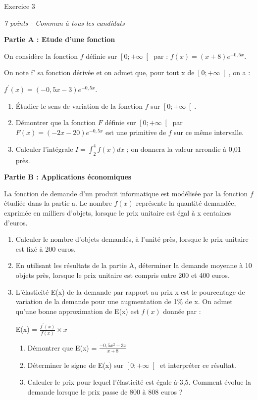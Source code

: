
%
\begin{h2}Exercice 3\end{h2}
\textit{7 points - Commun à tous les candidats}
\par
\textbf{Partie A : Etude d'une fonction}
\par
On considère la fonction $f$ définie sur $\left[0 ;+\infty \right[$ par : $f\left(x\right)=\left(x+8\right) e^{-0,5x}$.
\par
On note f' sa fonction dérivée et on admet que, pour tout x de $\left[0 ;+\infty \right[$, on a :
\par
$f^{\prime}\left(x\right)=\left(-0,5x-3\right)e^{-0,5x}$.
\begin{enumerate}
     \item
     Étudier le sens de variation de la fonction $f$ sur $\left[0 ; +\infty \right[$.
     \item
     Démontrer que la fonction $F$ définie sur $\left[0 ;+\infty \right[$ par $F\left(x\right)=\left(-2x -20\right) e^{-0,5x}$ est une primitive de $f$ sur ce même intervalle.
     \item
     Calculer l'intégrale $I=\int_{2}^{4}f\left(x\right)dx$ ; on donnera la valeur arrondie à 0,01 près.
\end{enumerate}
\par
\textbf{Partie B : Applications économiques}
\par
La fonction de demande d'un produit informatique est modélisée par la fonction $f$ étudiée dans la partie a. Le nombre $f\left(x\right)$ représente la quantité demandée, exprimée en milliers d'objets, lorsque le prix unitaire est égal à x centaines d'euros.
\begin{enumerate}
     \item
     Calculer le nombre d'objets demandés, à l'unité près, lorsque le prix unitaire est fixé à 200 euros.
     \item
     En utilisant les résultats de la partie A, déterminer la demande moyenne à 10 objets près, lorsque le prix unitaire est compris entre 200 et 400 euros.
     \item
     L'élasticité E(x)  de la demande par rapport au prix x est le pourcentage de variation de la demande pour une augmentation de 1\% de x. On admet qu'une bonne approximation de E(x) est $f\left(x\right)$ donnée par :
     \par
     E(x) = $\frac{f^{\prime}\left(x\right)}{f\left(x\right)}\times x$
     \begin{enumerate}[label=\alph*.]
          \item
          Démontrer que E(x) = $\frac{-0,5x^{2}-3x}{x+8}$
          \item
          Déterminer le signe de E(x) sur $\left[0 ; +\infty \right[$ et interpréter ce résultat.
          \item
          Calculer le prix pour lequel l'élasticité est égale à-3,5. Comment évolue la demande lorsque le prix passe de 800 à 808 euros ?
     \end{enumerate}
\end{enumerate}

